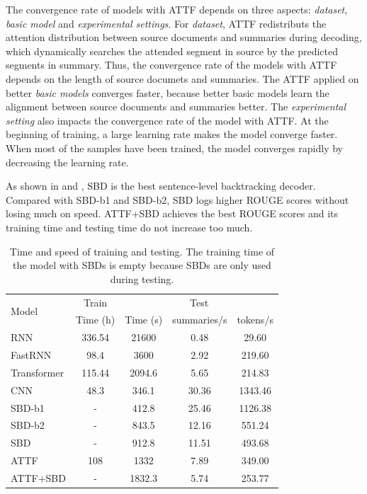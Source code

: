 The convergence rate of models with ATTF depends on three aspects:
{\em dataset}, {\em basic model} and {\em experimental settings}.
For {\em dataset}, ATTF redistributs the attention distribution between source documents and summaries during decoding,
which dynamically searches the attended segment in source by the predicted segments in summary.
Thus, the convergence rate of the models with ATTF depends on the length of source documets and summaries.
The ATTF applied on better {\em basic models} converges faster,
because better basic models learn the alignment between source documents and summaries better.
The {\em experimental setting} also impacts the convergence rate of the model with ATTF.
At the beginning of training, a large learning rate makes the model converge faster. 
When most of the samples have been trained, 
the model converges rapidly by decreasing the learning rate.

As shown in  and , 
SBD is the best sentence-level backtracking decoder.
Compared with SBD-b1 and SBD-b2,
SBD logs higher ROUGE scores without losing much on speed. 
ATTF+SBD achieves the best ROUGE scores 
and its training time and testing time do not increase too much.

\begin{table}[th!]
\centering
\caption{Time and speed of training and testing. The training time of the model with SBDs
is empty because SBDs are only used during testing.}
\begin{tabular}{|l|c|c|c|c|}
\hline
\multirow{2}{*}{Model} & Train & \multicolumn{3}{|c|}{Test} \\
\cline{2-5}
& Time (h) & Time (s) & summaries/s & tokens/s \\
\hline
RNN  & 336.54 &21600 & 0.48 & 29.60 \\
FastRNN & 98.4  & 3600 & 2.92 & 219.60 \\
Transformer & 115.44 & 2094.6 & 5.65 & 214.83 \\
\hline
CNN & 48.3 &346.1 & 30.36 & 1343.46 \\
SBD-b1 & - & 412.8 & 25.46 & 1126.38 \\
SBD-b2 & -  &843.5 &12.16 & 551.24 \\
SBD & - &912.8 & 11.51 & 493.68 \\
ATTF & 108 &1332 & 7.89 &  349.00 \\
ATTF+SBD & - &1832.3 & 5.74 &  253.77 \\
\hline
\end{tabular}
\label{tab:eval_speed}
\end{table}

